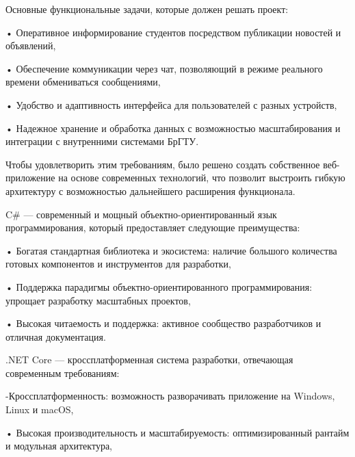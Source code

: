 {\gostFont
	
	\par \redline Основные функциональные задачи, которые должен решать проект:
	
	\par \redline • Оперативное информирование студентов посредством публикации новостей и объявлений,
	
	\par \redline • Обеспечение коммуникации через чат, позволяющий в режиме реального времени обмениваться сообщениями,
	
	\par \redline • Удобство и адаптивность интерфейса для пользователей с разных устройств,
	
	\par \redline • Надежное хранение и обработка данных с возможностью масштабирования и интеграции с внутренними системами БрГТУ.
	
	\par \redline Чтобы удовлетворить этим требованиям, было решено создать собственное веб-приложение на основе современных технологий, что позволит выстроить гибкую архитектуру с возможностью дальнейшего расширения функционала. 
	
	\par \redline C\# — современный и мощный объектно-ориентированный язык программирования, который предоставляет следующие преимущества:
	
	\par \redline • Богатая стандартная библиотека и экосистема: наличие большого количества готовых компонентов и инструментов для разработки,
	
	\par \redline • Поддержка парадигмы объектно-ориентированного программирования: упрощает разработку масштабных проектов,
	
	\par \redline • Высокая читаемость и поддержка: активное сообщество разработчиков и отличная документация.
	
	\par \redline .NET Core — кроссплатформенная система разработки, отвечающая современным требованиям:
	
	\par \redline -Кроссплатформенность: возможность разворачивать приложение на Windows, \\Linux и macOS,
	
	\par \redline • Высокая производительность и масштабируемость: оптимизированный рантайм и модульная архитектура,
	
}
